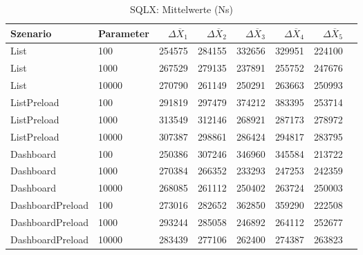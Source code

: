 
\begin{table}[ht]
\setlength{\extrarowheight}{-1pt}
\centering
\caption{SQLX: Mittelwerte (Ns)}
\begin{tabular}{llrrrrrr}
\toprule
Szenario & Parameter & ${\Delta \overline{X}_1}$ & ${\Delta \overline{X}_2}$ & ${\Delta \overline{X}_3}$ & ${\Delta \overline{X}_4}$ & ${\Delta \overline{X}_5}$ \\
\midrule
	List & 100 & 254575 & 284155 & 332656 & 329951 & 224100 \\
	List & 1000 & 267529 & 279135 & 237891 & 255752 & 247676 \\
	List & 10000 & 270790 & 261149 & 250291 & 263663 & 250993 \\
	ListPreload & 100 & 291819 & 297479 & 374212 & 383395 & 253714 \\
	ListPreload & 1000 & 313549 & 312146 & 268921 & 287173 & 278972 \\
	ListPreload & 10000 & 307387 & 298861 & 286424 & 294817 & 283795 \\
	Dashboard & 100 & 250386 & 307246 & 346960 & 345584 & 213722 \\
	Dashboard & 1000 & 270384 & 266352 & 233293 & 247253 & 242359 \\
	Dashboard & 10000 & 268085 & 261112 & 250402 & 263724 & 250003 \\
	DashboardPreload & 100 & 273016 & 282652 & 362850 & 359290 & 222508 \\
	DashboardPreload & 1000 & 293244 & 285058 & 246892 & 264112 & 252677 \\
	DashboardPreload & 10000 & 283439 & 277106 & 262400 & 274387 & 263823 \\
\bottomrule
\end{tabular}
\label{tab:mittelwerte_sqlx_ns}
\end{table}
	
